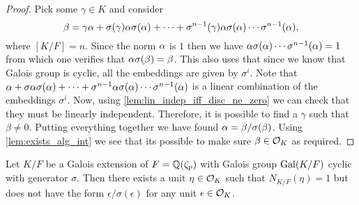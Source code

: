 \begin{proof}
  Pick some $\gamma \in K$ and consider \[\beta=\gamma \alpha+ \sigma(\gamma)\alpha \sigma(\alpha)+\cdots+\sigma^{n-1}(\gamma)\alpha \sigma(\alpha)\cdots \sigma^{n-1}(\alpha),\] where $[K/F]=n$. Since the norm $\alpha$ is $1$ then we have $\alpha \sigma(\alpha)\cdots \sigma^{n-1}(\alpha)=1$ from which one verifies that $\alpha \sigma(\beta)=\beta$. This also uses that since we know that Galois group is cyclic, all the embeddings are given by $\sigma^i$. Note that $ \alpha+ \sigma\alpha \sigma(\alpha)+\cdots+\sigma^{n-1}\alpha \sigma(\alpha)\cdots \sigma^{n-1}(\alpha)$ is a linear combination of the embeddings $\sigma^i$. Now, using \ref{lem:lin_indep_iff_disc_ne_zero} we can check that they must be linearly independent. Therefore, it is possible to find a $\gamma$ such that $\beta \neq 0$. Putting everything together we have found $\alpha=\beta/\sigma(\beta)$. Using \ref{lem:exists_alg_int} we see that its possible to make sure $\beta \in \mathcal{O}_K$ as required.
	

	

\end{proof}


\begin{lemma}\label{lem:HilbertNot90}
	Let $K/F$ be a Galois extension of $F=\mathbb{Q}(\zeta_p)$ with  Galois group $\operatorname{Gal}(K/F)$ cyclic with generator $\sigma$. Then there exists a unit $\eta \in \mathcal{O}_K$ such that $N_{K/F}(\eta)=1$ but does not have the form $\epsilon/\sigma(\epsilon)$ for any unit $\epsilon \in \mathcal{O}_K$.
	
\end{lemma}

